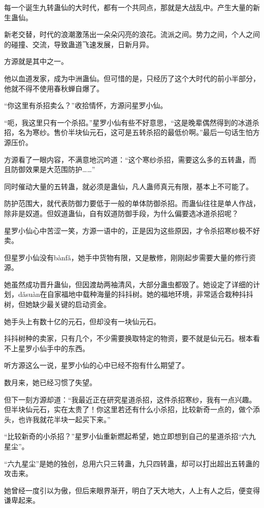 \begin{this_body}
每一个诞生九转蛊仙的大时代，都有一个共同点，那就是大战乱中。产生大量的新生蛊仙。

新老交替，时代的浪潮激荡出一朵朵闪亮的浪花。流派之间。势力之间，个人之间的碰撞、交流，导致蛊道飞速发展，日新月异。

方源就是其中之一。

他以血道发家，成为中洲蛊仙。但可惜的是，只经历了这个大时代的前小半部分，他就不得不使用春秋蝉自爆了。

“你这里有杀招卖么？”收拾情怀，方源问星罗小仙。

“呃，我这里只有一个杀招。”星罗小仙有些不好意思，“这是晚辈偶然得到的冰道杀招，名为寒纱。售价半块仙元石，这可是五转杀招的最低价啊。”最后一句话生怕方源压价。

方源看了一眼内容，不满意地沉吟道：“这个寒纱杀招，需要这么多的五转蛊，而且防御效果是大范围防护……”

同时催动大量的五转蛊，就必须是蛊仙，凡人蛊师真元有限，基本上不可能了。

防护范围大，就代表防御力要低于一般的单体防御杀招。而蛊仙往往是单人作战，除非是奴道。但奴道蛊仙，自有奴道防御手段，为什么偏要选冰道杀招呢？

星罗小仙心中苦涩一笑，方源一语中的，正是因为这些原因，才令杀招寒纱极不好卖。

但星罗小仙没有bànfǎ，她手中货物有限，又是散修，刚刚起步需要大量的修行资源。

她虽然成功晋升蛊仙，但因渡劫两袖清风，大部分蛊虫都毁了。她设定了详细的计划，dǎsuàn在自家福地中载种海量的抖抖树。她的福地环境，非常适合栽种抖抖树，但她缺少最关键的启动资金。

她手头上有数十亿的元石，但却没有一块仙元石。

抖抖树种的卖家，只有几个，不少需要换取特定的物资，要不就是仙元石。根本看不上星罗小仙手中的东西。

听方源这么一说，星罗小仙的心中已经不抱有什么期望了。

数月来，她已经习惯了失望。

但下一刻方源却道：“我最近正在研究星道杀招，这件杀招寒纱，我有一点兴趣。但半块仙元石，实在太贵了！你这里若还有什么小杀招，比较新奇一点的，做个添头，也许我就花半块一起买下来。”

“比较新奇的小杀招？”星罗小仙重新燃起希望，她立即想到自己的星道杀招“六九星尘”。

“六九星尘”是她的独创，总用六只三转蛊，九只四转蛊，却可以打出超出五转蛊的攻击来。

她曾经一度引以为傲，但后来眼界渐开，明白了天大地大，人上有人之后，便变得谦卑起来。


\end{this_body}
